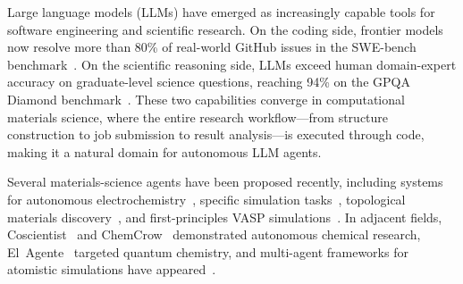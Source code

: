 \documentclass{article}
\begin{document}
Large language models (LLMs) have emerged as increasingly capable tools for software engineering and scientific research.
On the coding side, frontier models now resolve more than 80\% of real-world GitHub issues in the SWE-bench benchmark~\citep{Jimenez2024}.
On the scientific reasoning side, LLMs exceed human domain-expert accuracy on graduate-level science questions, reaching 94\% on the GPQA Diamond benchmark~\citep{Rein2024}.
These two capabilities converge in computational materials science, where the entire research workflow---from structure construction to job submission to result analysis---is executed through code, making it a natural domain for autonomous LLM agents.

Several materials-science agents have been proposed recently, including systems for
autonomous electrochemistry~\citep{Zheng2025},
specific simulation tasks~\citep{Liu2025},
topological materials discovery~\citep{Zhang2025topo}, and
first-principles VASP simulations~\citep{Xia2025vasp}.
In adjacent fields,
Coscientist~\citep{Boiko2023} and
ChemCrow~\citep{Bran2024} demonstrated autonomous chemical research,
El~Agente~\citep{Zou2025} targeted quantum chemistry, and multi-agent frameworks for atomistic simulations have appeared~\citep{Vriza2026,Ansari2024}.
\end{document}
